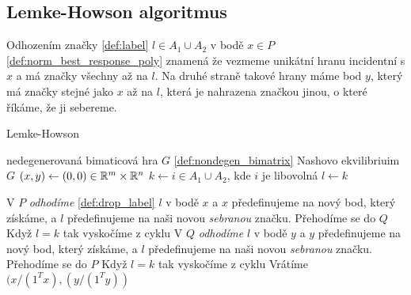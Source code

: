 \subsection{Lemke-Howson algoritmus}
\begin{definition}
\label{def:drop_label}
Odhozením značky \ref{def:label} $l \in A_1 \cup A_2$ v bodě $x \in P$ \ref{def:norm_best_response_poly} znamená že vezmeme unikátní hranu incidentní s $x$ a má značky všechny až na $l$. 
Na druhé straně takové hrany máme bod $y$, který má značky stejné jako $x$ až na $l$, která je nahrazena značkou jinou, o které říkáme, že ji sebereme. 
\end{definition}

\begin{algorithm}
    \algrenewcommand{}
    \algrenewcommand{}
    \caption{Lemke-Howson}
    \label{alg:lemke_howson}
    \begin{algorithmic}[1]
        \Require  nedegenerovaná bimaticová hra $G$ \ref{def:nondegen_bimatrix}
        \Ensure  Nashovo ekvilibriuim $G$
        \State $(x,y) \leftarrow (0,0) \in \mathbb{R}^m \times \mathbb{R}^n$
        \State $k \leftarrow i \in A_1 \cup A_2$, kde $i$ je libovolná
        \State $l \leftarrow k$
        
        \State V $P$ \textit{odhodíme} \ref{def:drop_label} $l$ v bodě $x$ a $x$ předefinujeme na nový bod, který získáme, a $l$ předefinujeme na naši novou \textit{sebranou} značku. 
        Přehodíme se do $Q$
        \State Když $l = k$ tak vyskočíme z cyklu
        \State V $Q$ \textit{odhodíme} $l$ v bodě $y$ a $y$ předefinujeme na nový bod, který získáme, a $l$ předefinujeme na naši novou \textit{sebranou} značku. 
        Přehodíme se do $P$
        \State Když $l = k$ tak vyskočíme z cyklu
        \EndWhile
        \State Vrátíme $(x/(1^Tx), (y/(1^Ty))$
    \end{algorithmic}
\end{algorithm}

